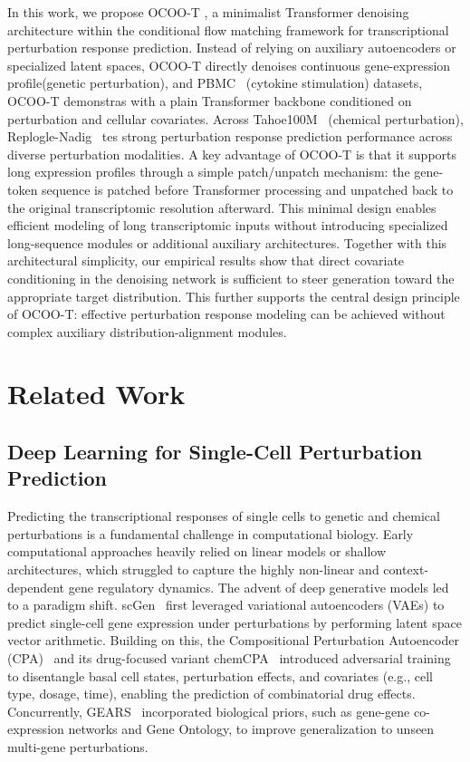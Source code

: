 \documentclass[11pt]{article}
\newcommand{\ocoot}{OCOO-T }
\begin{document}
In this work, we propose \ocoot, a minimalist Transformer denoising architecture within the conditional flow matching framework for transcriptional perturbation response prediction. Instead of relying on auxiliary autoencoders or specialized latent spaces, OCOO-T directly denoises continuous gene-expression profile(genetic perturbation), and PBMC~\cite{parsebiosciences2023pbmc} (cytokine stimulation) datasets, OCOO-T demonstras with a plain Transformer backbone conditioned on perturbation and cellular covariates. Across Tahoe100M~\cite{zhang2025tahoe100m} (chemical perturbation), Replogle-Nadig~\cite{nadig2025transcriptomewide} tes strong perturbation response prediction performance across diverse perturbation modalities. A key advantage of OCOO-T is that it supports long expression profiles through a simple patch/unpatch mechanism: the gene-token sequence is patched before Transformer processing and unpatched back to the original transcriptomic resolution afterward. This minimal design enables efficient modeling of long transcriptomic inputs without introducing specialized long-sequence modules or additional auxiliary architectures. Together with this architectural simplicity, our empirical results show that direct covariate conditioning in the denoising network is sufficient to steer generation toward the appropriate target distribution. This further supports the central design principle of OCOO-T: effective perturbation response modeling can be achieved without complex auxiliary distribution-alignment modules.

\enlargethispage{\baselineskip}
\section{Related Work}

\subsection{Deep Learning for Single-Cell Perturbation Prediction}
Predicting the transcriptional responses of single cells to genetic and chemical perturbations is a fundamental challenge in computational biology. Early computational approaches heavily relied on linear models or shallow architectures, which struggled to capture the highly non-linear and context-dependent gene regulatory dynamics. The advent of deep generative models led to a paradigm shift. scGen~\cite{lotfollahi2019scgen} first leveraged variational autoencoders (VAEs) to predict single-cell gene expression under perturbations by performing latent space vector arithmetic. Building on this, the Compositional Perturbation Autoencoder (CPA)~\cite{lotfollahi2023cpa} and its drug-focused variant chemCPA~\cite{hetzel2022chemcpa} introduced adversarial training to disentangle basal cell states, perturbation effects, and covariates (e.g., cell type, dosage, time), enabling the prediction of combinatorial drug effects. Concurrently, GEARS~\cite{roohani2024gears} incorporated biological priors, such as gene-gene co-expression networks and Gene Ontology, to improve generalization to unseen multi-gene perturbations.
\end{document}
